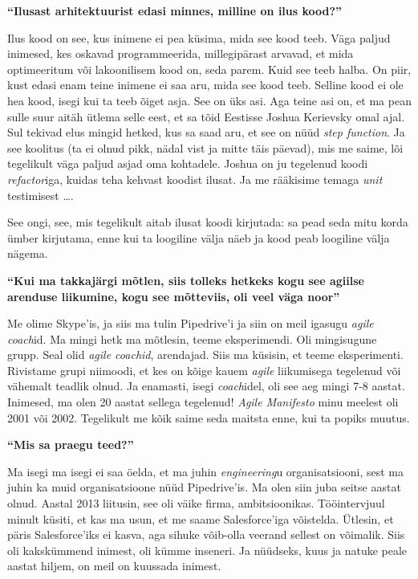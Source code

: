 \textbf{\enquote{Ilusast arhitektuurist edasi minnes, milline on ilus kood?}}

Ilus kood on see, kus inimene ei pea küsima, mida see kood teeb. Väga 
paljud inimesed, kes oskavad programmeerida, millegipärast arvavad, et mida 
optimeeritum või lakoonilisem kood on, seda parem. Kuid see teeb halba. On piir, kust
edasi enam teine inimene ei saa aru, mida see kood teeb. Selline kood ei ole hea 
kood, isegi kui ta teeb õiget asja. See on üks asi. Aga teine asi on, et ma 
pean sulle suur aitäh ütlema selle eest, et sa tõid Eestisse Joshua 
Kerievsky omal ajal. Sul tekivad elus mingid hetked, kus sa saad aru, 
et see on nüüd \emph{step function}. Ja see koolitus (ta ei olnud pikk, nädal 
vist ja mitte täis päevad), mis me saime, lõi 
tegelikult väga paljud asjad oma kohtadele. Joshua on ju tegelenud koodi \emph{refactor}iga, 
 kuidas teha kehvast koodist ilusat. Ja me rääkisime temaga \emph{unit} 
testimisest \ldots.

See ongi, see, mis tegelikult aitab ilusat koodi kirjutada: sa 
pead seda mitu korda ümber kirjutama, enne kui ta loogiline välja näeb ja 
kood peab loogiline välja nägema.

\textbf{\enquote{Kui ma takkajärgi mõtlen, siis tolleks hetkeks kogu see 
agiilse arenduse liikumine, kogu see mõtteviis, oli veel väga noor}}

Me olime Skype'is, ja siis ma tulin Pipedrive'i ja siin on meil 
igasugu \emph{agile coach}id. Ma mingi hetk ma mõtlesin, teeme eksperimendi. 
Oli mingisugune grupp. Seal olid \emph{agile coachid}, arendajad. Siis ma 
küsisin, et teeme eksperimenti. Rivistame grupi niimoodi, et kes on kõige kauem 
\emph{agile} liikumisega tegelenud  või vähemalt teadlik olnud. Ja enamasti, 
isegi \emph{coach}idel, oli see aeg mingi 7-8 aastat. Inimesed, ma olen 20 
aastat sellega tegelenud! \emph{Agile Manifesto} minu meelest oli 2001 või 
2002. Tegelikult me kõik saime seda maitsta enne, kui ta popiks muutus.

\textbf{\enquote{Mis sa praegu teed?}}

Ma isegi ma isegi ei saa öelda, et ma juhin \emph{engineering}u 
organisatsiooni, sest ma juhin ka muid organisatsioone nüüd 
Pipedrive'is. Ma olen siin juba seitse aastat olnud. Aastal 
2013 liitusin, see oli väike firma, ambitsioonikas. Tööintervjuul minult 
küsiti, et kas ma usun, et me saame Salesforce'iga võistelda. Ütlesin, et päris 
Salesforce'iks ei kasva, aga sihuke võib-olla veerand sellest on võimalik. Siis 
oli kakskümmend inimest, oli kümme inseneri. Ja nüüdseks, kuus ja natuke peale 
aastat hiljem, on meil on kuussada inimest.

